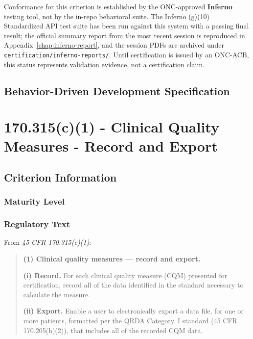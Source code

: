 Conformance for this criterion is established by the ONC-approved
\textbf{Inferno} testing tool, not by the in-repo behavioral suite. The
Inferno (g)(10) Standardized API test suite has been run against this system
with a passing final result; the official summary report from the most
recent session is reproduced in Appendix~\ref{chap:inferno-report}, and the
session PDFs are archived under \texttt{certification/inferno-reports/}.
Until certification is issued by an ONC-ACB, this status represents
validation evidence, not a certification claim.

\section{Behavior-Driven Development Specification}




\chapter{\textsection{} 170.315(c)(1) - Clinical Quality Measures - Record and Export}
\label{chap:c1}


\section{Criterion Information}

\subsection{Maturity Level}

\subsection{Regulatory Text}

From \textit{45 CFR \textsection{} 170.315(c)(1)}:

\begin{quotation}
\textbf{(1) Clinical quality measures --- record and export.}

\textbf{(i) Record.} For each clinical quality measure (CQM) presented for certification, record all of the data identified in the standard necessary to calculate the measure.

\textbf{(ii) Export.} Enable a user to electronically export a data file, for one or more patients, formatted per the QRDA Category~I standard (45 CFR 170.205(h)(2)), that includes all of the recorded CQM data.
\end{quotation}

